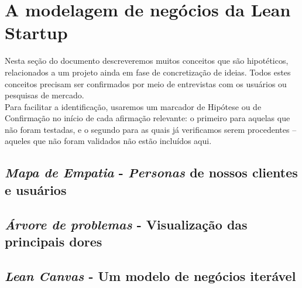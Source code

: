 \documentclass[12pt,a4paper,twoside,hyphens,english,brazil]{abntex2}
\newcommand{\hip}{{\color{BlueViolet}\framebox[1.1\width]{HIP}}}
\newcommand{\conf}{{\color{OliveGreen}\framebox[1.1\width]{CNF}}}
\begin{document}

\section{A modelagem de negócios da Lean Startup}

Nesta seção do documento descreveremos muitos conceitos que são hipotéticos, relacionados a um projeto ainda em fase de concretização de ideias. Todos estes conceitos precisam ser confirmados por meio de entrevistas com os usuários ou pesquisas de mercado.\\
Para facilitar a identificação, usaremos um marcador de Hipótese \hip{} ou de Confirmação \conf{} no início de cada afirmação relevante: o primeiro para aquelas que não foram testadas, e o segundo para as quais já verificamos serem procedentes -- aqueles que não foram validados não estão incluídos aqui.


\subsection{\emph{Mapa de Empatia} - \emph{Personas} de nossos clientes e usuários}


\subsection{\emph{Árvore de problemas} - Visualização das principais dores}

\subsection{\emph{Lean Canvas} - Um modelo de negócios iterável}
\end{document}
